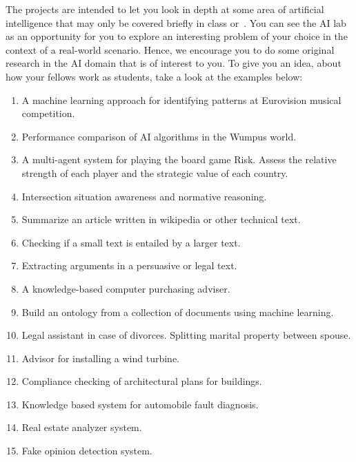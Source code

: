 \documentclass[a4paper,12pt]{report}
\begin{document}
The projects are intended to let you look in depth at some area of artificial intelligence 
that may only be covered briefly in class or~\cite{russell2003artificial}. 
You can see the AI lab as an opportunity for you to explore an interesting problem of your choice in the context of a real-world scenario.
Hence, we encourage you to do some original research in the AI domain that is of interest to you. 
To give you an idea, about how your fellows work as students, take a look at the examples below:


\begin{enumerate}
 \item A machine learning approach for identifying patterns at Eurovision musical competition. 
\item Performance comparison of AI algorithms in the Wumpus world.
\item A multi-agent system for playing the board game Risk. Assess the
relative strength of each player and the strategic value of each country. 
\item Intersection situation awareness and normative reasoning.
\item Summarize an article written in wikipedia or other technical text.
\item Checking if a small text is entailed by a larger text.
\item Extracting arguments in a persuasive or legal text.
\item A knowledge-based computer purchasing adviser.
\item Build an ontology from a collection of documents using machine learning.
\item Legal assistant in case of divorces. Splitting marital property between spouse.
\item Advisor for installing a wind turbine.
\item Compliance checking of architectural plans for buildings.
\item Knowledge based system for automobile fault diagnosis.
\item Real estate analyzer system. 
\item Fake opinion detection system. 
\end{enumerate}



\end{document}
